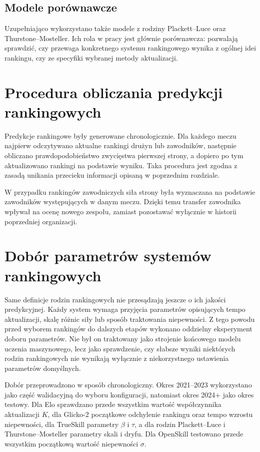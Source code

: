 \subsection{Modele porównawcze}

Uzupełniająco wykorzystano także modele z rodziny Plackett--Luce oraz Thurstone--Mosteller. Ich rola w pracy jest głównie porównawcza: pozwalają sprawdzić, czy przewaga konkretnego systemu rankingowego wynika z ogólnej idei rankingu, czy ze specyfiki wybranej metody aktualizacji.

\section{Procedura obliczania predykcji rankingowych}

Predykcje rankingowe były generowane chronologicznie. Dla każdego meczu najpierw odczytywano aktualne rankingi drużyn lub zawodników, następnie obliczano prawdopodobieństwo zwycięstwa pierwszej strony, a dopiero po tym aktualizowano rankingi na podstawie wyniku. Taka procedura jest zgodna z zasadą unikania przecieku informacji opisaną w poprzednim rozdziale.

W przypadku rankingów zawodniczych siła strony była wyznaczana na podstawie zawodników występujących w danym meczu. Dzięki temu transfer zawodnika wpływał na ocenę nowego zespołu, zamiast pozostawać wyłącznie w historii poprzedniej organizacji.

\section{Dobór parametrów systemów rankingowych}

Same definicje rodzin rankingowych nie przesądzają jeszcze o ich jakości predykcyjnej. Każdy system wymaga przyjęcia parametrów opisujących tempo aktualizacji, skalę różnic siły lub sposób traktowania niepewności. Z tego powodu przed wyborem rankingów do dalszych etapów wykonano oddzielny eksperyment doboru parametrów. Nie był on traktowany jako strojenie końcowego modelu uczenia maszynowego, lecz jako sprawdzenie, czy słabsze wyniki niektórych rodzin rankingowych nie wynikają wyłącznie z niekorzystnego ustawienia parametrów domyślnych.

Dobór przeprowadzono w sposób chronologiczny. Okres 2021--2023 wykorzystano jako część walidacyjną do wyboru konfiguracji, natomiast okres 2024+ jako okres testowy. Dla Elo sprawdzano przede wszystkim wartość współczynnika aktualizacji $K$, dla Glicko-2 początkowe odchylenie rankingu oraz tempo wzrostu niepewności, dla TrueSkill parametry $\beta$ i $\tau$, a dla rodzin Plackett--Luce i Thurstone--Mosteller parametry skali i dryfu. Dla OpenSkill testowano przede wszystkim początkową wartość niepewności $\sigma$.

